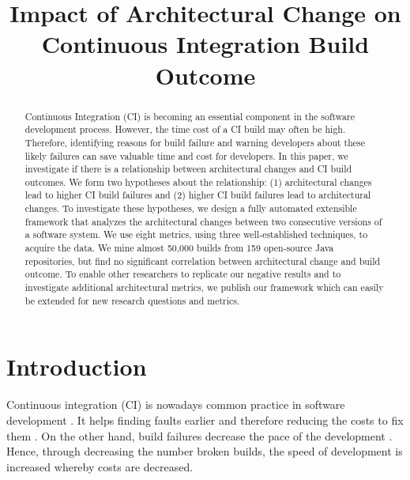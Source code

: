 \documentclass[conference]{IEEEtran}
\begin{document}
\title{Impact of Architectural Change on
	Continuous Integration Build Outcome\\
}

\author{

\and
{}
}

\maketitle

\begin{abstract}
Continuous Integration (CI) is becoming an essential component in the software development process.
However, the time cost of a CI build may often be high.
Therefore, identifying reasons for build failure and warning developers about these likely failures can save valuable time and cost for developers.
In this paper, we investigate if there is a relationship between architectural changes and CI build outcomes.
We form two hypotheses about the relationship: (1) architectural changes lead to higher CI build failures and (2) higher CI build failures lead to architectural changes.
To investigate these hypotheses, we design a fully automated extensible framework that analyzes the architectural changes between two consecutive versions of a software system.
We use eight metrics, using three well-established techniques, to acquire the data.
We mine almost 50,000 builds from 159 open-source Java repositories, but find no significant correlation between architectural change and build outcome. 
To enable other researchers to replicate our negative results and to investigate additional architectural metrics, we publish our framework which can easily be extended for new research questions and metrics.
\end{abstract}

\section{Introduction}

Continuous integration (CI) is nowadays common practice in software development \cite{CI-Common}. It helps finding faults earlier and therefore reducing the costs to fix them \cite{NutzenCI}. On the other hand, build failures decrease the pace of the development \cite{Costs-BuildFailures}. Hence, through decreasing the number broken builds, the speed of development is increased whereby costs are decreased.
\end{document}
